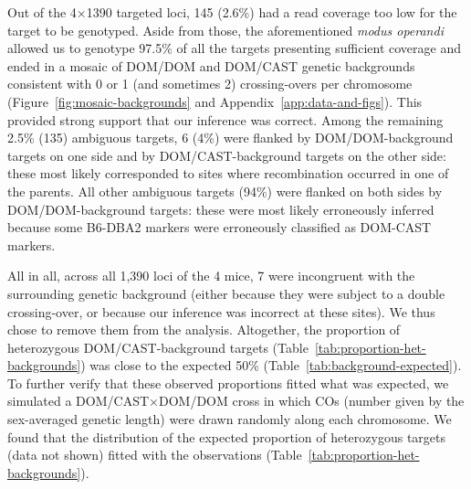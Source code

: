 Out of the 4$\times$1390 targeted loci, 145 (2.6\%) had a read coverage too low for the target to be genotyped.
Aside from those, the aforementioned \textit{modus operandi} allowed us to genotype 97.5\% of all the targets presenting sufficient coverage and ended in a mosaic of DOM/DOM and DOM/CAST genetic backgrounds consistent with 0 or 1 (and sometimes 2) crossing-overs per chromosome (Figure~\ref{fig:mosaic-backgrounds} and Appendix~\ref{app:data-and-figs}). 
This provided strong support that our inference was correct.
Among the remaining 2.5\% (135) ambiguous targets, 6 (4\%) were flanked by DOM/DOM-background targets on one side and by DOM/CAST-background targets on the other side: these most likely corresponded to sites where recombination occurred in one of the parents.
All other ambiguous targets (94\%) were flanked on both sides by DOM/DOM-background targets: these were most likely erroneously inferred because some B6-DBA2 markers were erroneously classified as DOM-CAST markers.


%

All in all, across all 1,390 loci of the 4 mice, 7 were incongruent with the surrounding genetic background (either because they were subject to a double crossing-over, or because our inference was incorrect at these sites). We thus chose to remove them from the analysis.
Altogether, the proportion of heterozygous DOM/CAST-background targets (Table~\ref{tab:proportion-het-backgrounds}) was close to the expected 50\% (Table~\ref{tab:background-expected}).
To further verify that these observed proportions fitted what was expected, we simulated a DOM/CAST$\times$DOM/DOM cross in which COs (number given by the sex-averaged genetic length) were drawn randomly along each chromosome. We found that the distribution of the expected proportion of heterozygous targets (data not shown) fitted with the observations (Table~\ref{tab:proportion-het-backgrounds}).

